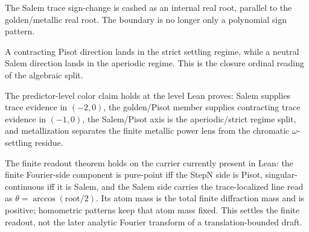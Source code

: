 \begin{theorem}\label{thm:salem-trace-real-root}\leanok{}
The Salem trace sign-change is cashed as an internal real root, parallel to
the golden/metallic real root.  The boundary is no longer only a polynomial
sign pattern.
\end{theorem}

\begin{theorem}\label{thm:salem-pisot-regime-split}\leanok{}
A contracting Pisot direction lands in the strict settling regime, while a
neutral Salem direction lands in the aperiodic regime.  This is the closure
ordinal reading of the algebraic split.
\end{theorem}

\begin{theorem}\label{thm:color-predictor-evidence}\leanok{}
The predictor-level color claim holds at the level Lean proves:
Salem supplies trace evidence in \((-2,0)\), the golden/Pisot member supplies
contracting trace evidence in \((-1,0)\), the Salem/Pisot axis is the
aperiodic/strict regime split, and metallization separates the finite metallic
power lens from the chromatic \(\omega\)-settling residue.
\end{theorem}

\begin{theorem}\label{thm:salem-color-line-fourier-atom}\leanok{}
The finite readout theorem holds on the carrier currently present in
Lean: the finite Fourier-side component is pure-point iff the StepN side is
Pisot, singular-continuous iff it is Salem, and the Salem side carries the
trace-localized line read as \(\theta=\arccos(\mathrm{root}/2)\).  Its atom mass
is the total finite diffraction mass and is positive; homometric patterns keep
that atom mass fixed.  This settles the finite readout, not the later analytic
Fourier transform of a translation-bounded draft.
\end{theorem}

